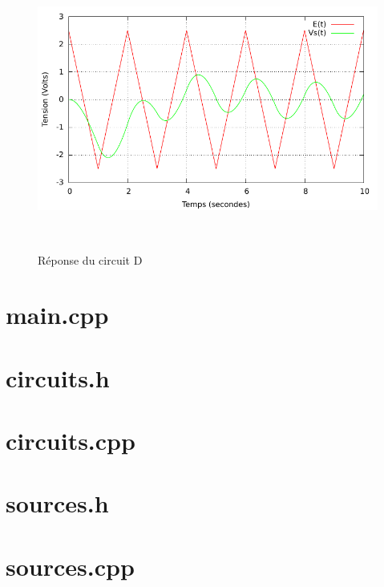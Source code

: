 \documentclass[a4paper,11pt]{article}
\begin{document}
\begin{figure}[h!]
\begin{minipage}[b]{0.5\linewidth}
   \end{minipage}
  \begin{minipage}[b]{0.5\linewidth}   
      \centering \includegraphics[scale=.68]{CDtriangle.pdf}
   \end{minipage}\\
 \caption{Réponse du circuit D}
\end{figure}




  \newpage
  \appendix
  
  \section{main.cpp}
    
    \newpage
  \section{circuits.h}
    
    \newpage
  \section{circuits.cpp}
    
    \newpage
   \section{sources.h}
    
    \newpage
   \section{sources.cpp}
    
    \newpage
\end{document}

